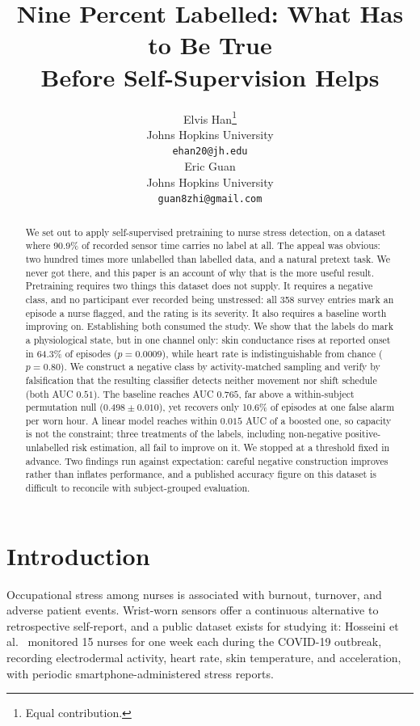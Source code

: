 \documentclass{article}
\title{Nine Percent Labelled: What Has to Be True\\
Before Self-Supervision Helps}
\author{%
  Elvis Han\thanks{Equal contribution.} \\
  Johns Hopkins University \\
  \texttt{ehan20@jh.edu} \\
  \And
  Eric Guan\footnotemark[1] \\
  Johns Hopkins University \\
  \texttt{guan8zhi@gmail.com} \\
}
\begin{document}
\maketitle

\begin{abstract}
We set out to apply self-supervised pretraining to nurse stress detection,
on a dataset where 90.9\% of recorded sensor time carries no label
at all. The appeal was obvious: two hundred times more unlabelled than labelled
data, and a natural pretext task. We never got there, and this paper is an
account of why that is the more useful result. Pretraining requires two things
this dataset does not supply. It requires a negative class, and no participant
ever recorded being unstressed: all 358 survey entries mark an episode a nurse
flagged, and the rating is its severity. It also requires a baseline worth
improving on. Establishing both consumed the study. We show that the labels do
mark a physiological state, but in one channel only: skin conductance rises at
reported onset in 64.3\% of episodes ($p = 0.0009$), while heart
rate is indistinguishable from chance ($p = 0.80$). We construct a negative
class by activity-matched sampling and verify by falsification that the
resulting classifier detects neither movement nor shift schedule (both
AUC $0.51$). The baseline reaches AUC $0.765$, far above a within-subject
permutation null ($0.498 \pm 0.010$), yet recovers only 10.6\% of
episodes at one false alarm per worn hour. A linear model reaches within
$0.015$ AUC of a boosted one, so capacity is not the constraint; three
treatments of the labels, including non-negative positive-unlabelled risk
estimation, all fail to improve on it. We stopped at a threshold fixed in
advance. Two findings run against expectation: careful negative construction
improves rather than inflates performance, and a published accuracy figure on
this dataset is difficult to reconcile with subject-grouped evaluation.
\end{abstract}

\section{Introduction}

Occupational stress among nurses is associated with burnout, turnover, and
adverse patient events. Wrist-worn sensors offer a continuous alternative to
retrospective self-report, and a public dataset exists for studying it:
Hosseini et al.\ \cite{hosseini2022} monitored 15 nurses for one week each
during the COVID-19 outbreak, recording electrodermal activity, heart rate,
skin temperature, and acceleration, with periodic smartphone-administered
stress reports.
\end{document}
